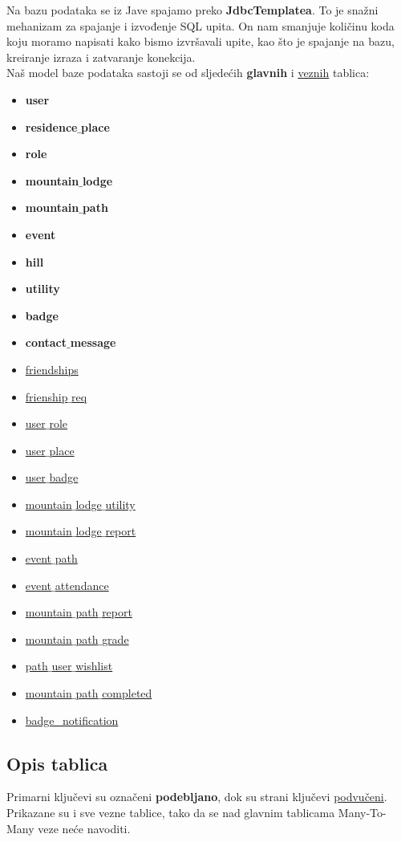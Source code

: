 		Na bazu podataka se iz Jave spajamo preko \textbf{JdbcTemplatea}. To je snažni mehanizam za spajanje i izvođenje SQL upita. On nam smanjuje količinu koda koju moramo napisati kako bismo izvršavali upite, kao što je spajanje na bazu, kreiranje izraza i zatvaranje konekcija. \\
		\newpage
	Naš model baze podataka sastoji se od sljedećih \textbf{glavnih} i \underline{veznih} tablica:
		\begin{itemize}[noitemsep]
		\item \textbf{user}
		\item \textbf{residence$\_$place}
		\item \textbf{role}
		\item \textbf{mountain$\_$lodge}
		\item \textbf{mountain$\_$path}
		\item \textbf{event}
		\item \textbf{hill}
		\item \textbf{utility}
		\item \textbf{badge}
		\item \textbf{contact$\_$message}
		\item \underline{friendships}
		\item \underline{frienship$\_$req}
		\item \underline{user$\_$role}
		\item \underline{user$\_$place}
		\item \underline{user$\_$badge}
		\item \underline{mountain$\_$lodge$\_$utility}
		\item \underline{mountain$\_$lodge$\_$report}
		\item \underline{event$\_$path}
		\item \underline{event$\_$attendance}
		\item \underline{mountain$\_$path$\_$report}
		\item \underline{mountain$\_$path$\_$grade}
		\item \underline{path$\_$user$\_$wishlist}
		\item \underline{mountain$\_$path$\_$completed}
		\item \underline{badge\_notification}

\end{itemize}
		 \newpage
			\subsection{Opis tablica}
			Primarni ključevi su označeni \textbf{podebljano}, dok su strani ključevi \underline{podvučeni}. \\
			Prikazane su i sve vezne tablice, tako da se nad glavnim tablicama Many-To-Many veze neće navoditi.
			
